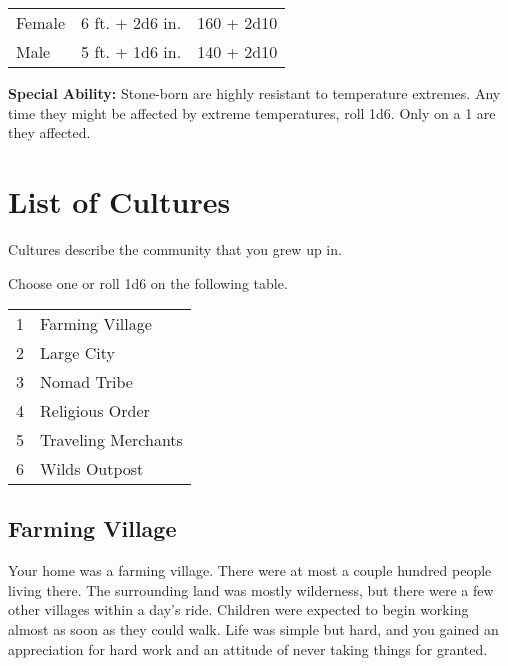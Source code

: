 \begin{multicols}{2}
\begin{center}
{
\begin{xtabular}{|l|l|l|}
Female & 6 ft. + 2d6 in. & 160 + 2d10 \\
Male & 5 ft. + 1d6 in. & 140 + 2d10 \\
\hline
\end{xtabular}
}
\end{center}

\textbf{Special Ability:} Stone-born are highly resistant to temperature extremes. Any time they might be affected by extreme temperatures, roll 1d6. Only on a 1 are they affected.

\section{List of Cultures}

Cultures describe the community that you grew up in. 

Choose one or roll 1d6 on the following table.

\begin{center}
{
\begin{xtabular}{|l|l|}
1 & Farming Village \\
2 & Large City \\
3 & Nomad Tribe \\
4 & Religious Order \\
5 & Traveling Merchants \\
6 & Wilds Outpost \\
\hline
\end{xtabular}
}
\end{center}

\subsection{Farming Village}

Your home was a farming village. There were at most a couple hundred
people living there. The surrounding land was mostly wilderness, but
there were a few other villages within a day's ride. Children were
expected to begin working almost as soon as they could walk. Life was
simple but hard, and you gained an appreciation for hard work and
an attitude of never taking things for granted.


\end{multicols}
